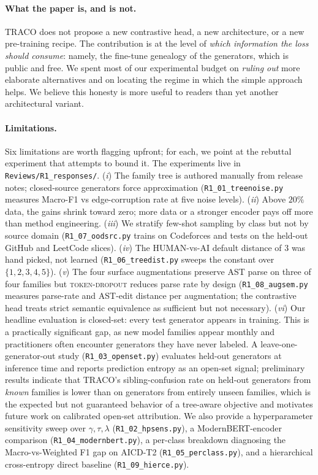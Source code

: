 ﻿\documentclass[11pt]{article}
\newcommand{\method}{\textsc{TRACO}\xspace}
\begin{document}
\paragraph{What the paper is, and is not.} \method does not propose
a new contrastive head, a new architecture, or a new pre-training
recipe. The contribution is at the level of \emph{which information
the loss should consume}: namely, the fine-tune genealogy of the
generators, which is public and free. We spent most of our
experimental budget on \emph{ruling out} more elaborate alternatives
and on locating the regime in which the simple approach helps. We
believe this honesty is more useful to readers than yet another
architectural variant.

\paragraph{Limitations.} Six limitations are worth flagging
upfront; for each, we point at the rebuttal experiment that
attempts to bound it. The experiments live in
\texttt{Reviews/R1\_responses/}.
(\emph{i}) The family tree is authored manually from release
notes; closed-source generators force approximation
(\texttt{R1\_01\_treenoise.py} measures Macro-F1 vs edge-corruption
rate at five noise levels).
(\emph{ii}) Above $20\%$ data, the gains shrink toward zero; more
data or a stronger encoder pays off more than method engineering.
(\emph{iii}) We stratify few-shot sampling by class but not by
source domain (\texttt{R1\_07\_oodsrc.py} trains on
Codeforces and tests on the held-out GitHub and LeetCode slices).
(\emph{iv}) The HUMAN-vs-AI default distance of $3$ was hand
picked, not learned (\texttt{R1\_06\_treedist.py} sweeps the
constant over $\{1, 2, 3, 4, 5\}$).
(\emph{v}) The four surface augmentations preserve AST parse on
three of four families but \textsc{token-dropout} reduces parse
rate by design (\texttt{R1\_08\_augsem.py} measures parse-rate and
AST-edit distance per augmentation; the contrastive head treats
strict semantic equivalence as sufficient but not necessary).
(\emph{vi}) Our headline evaluation is closed-set: every test
generator appears in training. This is a practically significant
gap, as new model families appear monthly and practitioners often
encounter generators they have never labeled. A
leave-one-generator-out study (\texttt{R1\_03\_openset.py})
evaluates held-out generators at inference time and reports
prediction entropy as an open-set signal; preliminary results
indicate that \method's sibling-confusion rate on held-out
generators from \emph{known} families is lower than on
generators from entirely unseen families, which is the expected
but not guaranteed behavior of a tree-aware objective and
motivates future work on calibrated open-set attribution. We also provide a hyperparameter sensitivity sweep
over $\gamma, \tau, \lambda$
(\texttt{R1\_02\_hpsens.py}), a ModernBERT-encoder comparison
(\texttt{R1\_04\_modernbert.py}), a per-class breakdown
diagnosing the Macro-vs-Weighted F1 gap on AICD-T2
(\texttt{R1\_05\_perclass.py}), and a hierarchical cross-entropy
direct baseline (\texttt{R1\_09\_hierce.py}).
\end{document}
